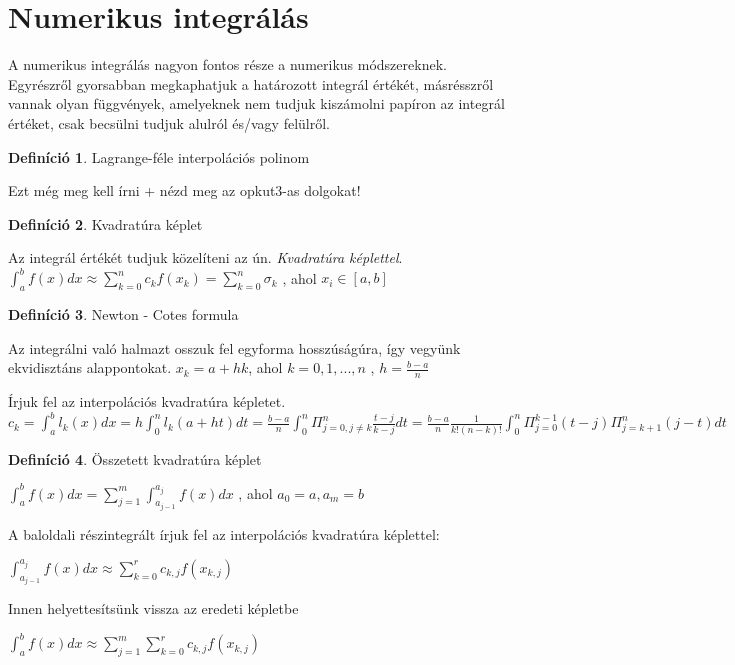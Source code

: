 \documentclass{article}
\theoremstyle{definition}
\newtheorem{definition}{Definíció}
\begin{document}
\section{Numerikus integrálás}
A numerikus integrálás nagyon fontos része a numerikus módszereknek. Egyrészről gyorsabban megkaphatjuk a határozott  integrál értékét, másrésszről vannak olyan függvények, amelyeknek nem tudjuk kiszámolni papíron az integrál értéket, csak becsülni tudjuk alulról és/vagy felülről.

\begin{definition}
Lagrange-féle interpolációs polinom

Ezt még meg kell írni + nézd meg az opkut3-as dolgokat!
\end{definition}

\begin{definition}
Kvadratúra képlet

Az integrál értékét tudjuk közelíteni az ún. \textit{Kvadratúra képlettel}. 
\newline
$\int_{a}^{b} f(x) dx \approx \sum_{k = 0}^{n} c_k f(x_k) = \sum_{k=0}^n \sigma_k$ , ahol $x_i \in [a,b]$
\end{definition}

\begin{definition}
Newton - Cotes formula

Az integrálni való halmazt osszuk fel egyforma hosszúságúra, így vegyünk ekvidisztáns alappontokat.
$x_k = a + hk $, ahol $k=0,1,...,n$ , $h = \frac{b-a}{n}$

Írjuk fel az interpolációs kvadratúra képletet.
\newline
$c_k = \int_a^{b} l_k(x) dx = h \int_0^{n} l_k (a+ht) dt = \frac{b-a}{n} \int_0 ^{n} \Pi_{j=0, j \neq k}^n \frac{t-j}{k-j} dt = \frac{b-a}{n} \frac{1}{k! (n-k)!} \int_0^n \Pi_{j=0}^{k-1} (t-j) \Pi_{j=k+1}^{n} (j-t) dt$
\end{definition}

\begin{definition}
Összetett kvadratúra képlet
\begin{center}
 $\int_a^{b} f(x) dx = \sum_{j = 1} ^{m} \int_{a_{j-1}} ^{a_j} f(x) dx$ , ahol $a_0 = a, a_m =b$   
\end{center}


A baloldali részintegrált írjuk fel az interpolációs kvadratúra képlettel:
\begin{center}
$\int_{a_{j-1}}^{a_j} f(x) dx \approx \sum_{k=0}^{r} c_{k,j}f(x_{k,j})$
\end{center}

Innen helyettesítsünk vissza az eredeti képletbe
\begin{center}
$\int_a^b f(x) dx \approx \sum_{j=1}^{m} \sum_{k=0}^{r} c_{k,j} f(x_{k,j})$
\end{center}
\end{definition}
\end{document}
